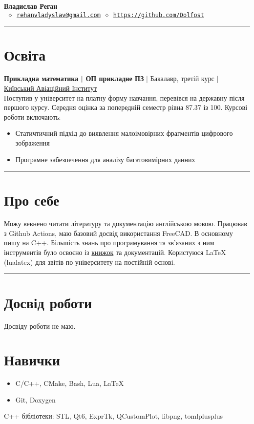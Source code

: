 


\newcommand{\crule}{\par\noindent\rule{\textwidth}{0.5pt}}


\thispagestyle{empty}

\begin{center}
	\LARGE \textbf{Владислав Реган}\\[4mm] \normalsize
	\texttt{ \(\diamond\)\
	\href{mailto:rehanvladyslav@gmail.com}{rehanvladyslav@gmail.com} \(\diamond\)
	\url{https://github.com/Dolfost}}
\end{center}
\crule
\section{Освіта}
\textbf{Прикладна математика | ОП прикладне ПЗ} | Бакалавр, третій курс | \href{http://nau.edu.ua/en/}{Київський Авіаційний Інститут}\\
Поступив у університет на платну форму навчання, перевівся на державну після першого курсу.
Середня оцінка за попередній семестр рівна 87.37 із 100.
Курсові роботи включають:
\begin{itemize}
	\item Статичтичний підхід до виявлення малоімовірних фрагментів цифрового зображення
	\item Програмне забезпечення для аналізу багатовимірних данних
\end{itemize}

\crule
\section{Про себе}
Можу вевнено читати літературу та документацію англійською мовою. Працював з
Github Actions, маю базовий досвід використання FreeCAD. В основному пишу на
C++. Більшість знань про програмування та зв'язаних з ним інструментів було
освоєно із
\href{https://github.com/Dolfost/Dolfost/blob/main/README.md#literature--sources}{книжок}
та документацій. Користуюся LaTeX (lualatex) для звітів по університету на
постійній основі.

\crule
\section{Досвід роботи}
Досвіду роботи не маю.

\section{Навички}
\begin{itemize}
	\item C/C++, CMake, Bash, Lua, LaTeX
	\item Git, Doxygen
\end{itemize}
C++ бібліотеки: STL, Qt6, ExprTk, QCustomPlot, libpng, tomlplusplus

